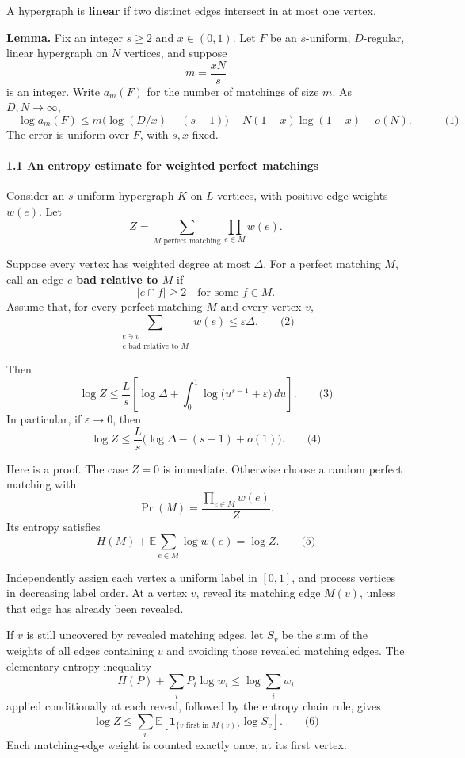 \documentclass[
  11pt,
  a4paper,
]{article}
\begin{document}
A hypergraph is \textbf{linear} if two distinct edges intersect in at
most one vertex.

\textbf{Lemma.} Fix an integer \(s\ge 2\) and \(x\in(0,1)\). Let \(F\)
be an \(s\)-uniform, \(D\)-regular, linear hypergraph on \(N\) vertices,
and suppose \[
m=\frac{xN}{s}
\] is an integer. Write \(a_m(F)\) for the number of matchings of size
\(m\). As \(D,N\to\infty\), \[
\boxed{\quad
\log a_m(F)
\le
m\bigl(\log(D/x)-(s-1)\bigr)
-N(1-x)\log(1-x)+o(N).
\quad} \qquad\text{(1)}
\] The error is uniform over \(F\), with \(s,x\) fixed.

\paragraph{1.1 An entropy estimate for weighted perfect
matchings}\label{an-entropy-estimate-for-weighted-perfect-matchings}

Consider an \(s\)-uniform hypergraph \(K\) on \(L\) vertices, with
positive edge weights \(w(e)\). Let \[
Z=\sum_{M\text{ perfect matching}}\prod_{e\in M}w(e).
\]

Suppose every vertex has weighted degree at most \(\Delta\). For a
perfect matching \(M\), call an edge \(e\) \textbf{bad relative to
\(M\)} if \[
|e\cap f|\ge 2
\quad\text{for some }f\in M.
\] Assume that, for every perfect matching \(M\) and every vertex \(v\),
\[
\sum_{\substack{e\ni v\\e\text{ bad relative to }M}}w(e)
\le \varepsilon\Delta. \qquad\text{(2)}
\]

Then \[
\log Z
\le
\frac{L}{s}\left[
\log\Delta+
\int_0^1\log\bigl(u^{s-1}+\varepsilon\bigr)\,du
\right]. \qquad\text{(3)}
\] In particular, if \(\varepsilon\to0\), then \[
\log Z
\le
\frac{L}{s}\bigl(\log\Delta-(s-1)+o(1)\bigr). \qquad\text{(4)}
\]

Here is a proof. The case \(Z=0\) is immediate. Otherwise choose a
random perfect matching with \[
\Pr(M)=\frac{\prod_{e\in M}w(e)}{Z}.
\] Its entropy satisfies \[
H(M)+\mathbb E\sum_{e\in M}\log w(e)=\log Z. \qquad\text{(5)}
\]

Independently assign each vertex a uniform label in \([0,1]\), and
process vertices in decreasing label order. At a vertex \(v\), reveal
its matching edge \(M(v)\), unless that edge has already been revealed.

If \(v\) is still uncovered by revealed matching edges, let \(S_v\) be
the sum of the weights of all edges containing \(v\) and avoiding those
revealed matching edges. The elementary entropy inequality \[
H(P)+\sum_i P_i\log w_i\le \log\sum_i w_i
\] applied conditionally at each reveal, followed by the entropy chain
rule, gives \[
\log Z\le
\sum_v
\mathbb E\!\left[
\mathbf 1_{\{v\text{ first in }M(v)\}}\log S_v
\right]. \qquad\text{(6)}
\] Each matching-edge weight is counted exactly once, at its first
vertex.
\end{document}
